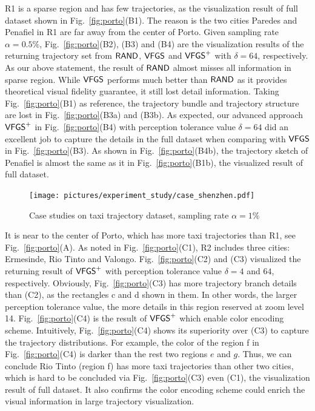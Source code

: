 R1 is a sparse region and has few trajectories, as the visualization result of full \pt{} dataset shown in Fig.~\ref{fig:porto}(B1).
The reason is the two cities Paredes and Penafiel in R1 are far away from the center of Porto.
Given sampling rate $\alpha=0.5\%$, Fig.~\ref{fig:porto}(B2), (B3) and (B4) are the visualization results of the returning trajectory set from $\mathsf{RAND}{}$, $\mathsf{VFGS}$ and $\mathsf{VFGS}^{+}$ with $\delta=64$, respectively.
As our above statement, the result of $\mathsf{RAND}$ almost misses all information in sparse region.
While $\mathsf{VFGS}$ performs much better than $\mathsf{RAND}$ as it provides theoretical visual fidelity guarantee, it still lost detail information.
Taking Fig.~\ref{fig:porto}(B1) as reference, the trajectory bundle and trajectory structure are lost in Fig.~\ref{fig:porto}(B3a) and (B3b).
As expected, our advanced approach $\mathsf{VFGS}^{+}$ in Fig.~\ref{fig:porto}(B4) with perception tolerance value $\delta=64$ did an excellent job to capture the details in the full dataset when comparing with $\mathsf{VFGS}$ in Fig.~\ref{fig:porto}(B3).
As shown in Fig.~\ref{fig:porto}(B4b), the trajectory sketch of Penafiel is almost the same as it in Fig.~\ref{fig:porto}(B1b), the visualized result of full dataset.


\begin{figure}[t]
	\centering
	\texttt{[image: pictures/experiment\_study/case\_shenzhen.pdf]}
	\vspace{-4mm}
	\caption{Case studies on \sz{} taxi trajectory dataset, sampling rate $\alpha = 1\%$}
	\label{fig:shenzhen}
    \vspace{-3mm}
\end{figure}

 It is near to the center of Porto, which has more taxi trajectories than R1, see Fig.~\ref{fig:porto}(A).
As noted in Fig.~\ref{fig:porto}(C1), R2 includes three cities: Ermesinde, Rio Tinto and Valongo.
Fig.~\ref{fig:porto}(C2) and (C3) visualized the returning result of $\mathsf{VFGS}^{+}$ with perception tolerance value $\delta=4$ and $64$, respectively.
Obviously, Fig.~\ref{fig:porto}(C3) has more trajectory branch details than (C2), as the rectangles c and d shown in them.
In other words, the larger perception tolerance value, the more details in this region reserved at zoom level 14.
Fig.~\ref{fig:porto}(C4) is the result of $\mathsf{VFGS}^{+}$ which enable color encoding scheme.
Intuitively, Fig.~\ref{fig:porto}(C4) shows its superiority over (C3) to capture the trajectory distributions.
For example, the color of the region f in Fig.~\ref{fig:porto}(C4) is {darker} than the rest two regions $e$ and $g$.
Thus, we can conclude Rio Tinto (region f) has more taxi trajectories than other two cities, which is hard to be concluded via Fig.~\ref{fig:porto}(C3) even (C1), the visualization result of full dataset.
It also confirms the color encoding scheme could enrich the visual information in large trajectory visualization.

